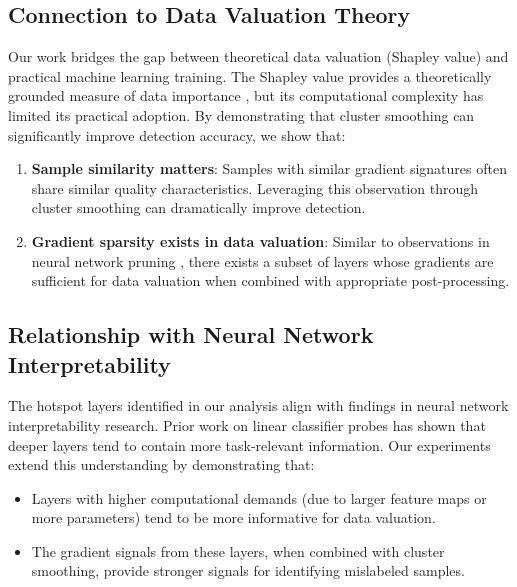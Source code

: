 \documentclass[12pt,a4paper]{report}
\begin{document}
\subsection{Connection to Data Valuation Theory}
\label{sec:theory_connection}

Our work bridges the gap between theoretical data valuation (Shapley value) and practical machine learning training. The Shapley value provides a theoretically grounded measure of data importance \citep{ghorbani2019data}, but its computational complexity has limited its practical adoption. By demonstrating that cluster smoothing can significantly improve detection accuracy, we show that:

\begin{enumerate}
    \item \textbf{Sample similarity matters}: Samples with similar gradient signatures often share similar quality characteristics. Leveraging this observation through cluster smoothing can dramatically improve detection.
    
    \item \textbf{Gradient sparsity exists in data valuation}: Similar to observations in neural network pruning \citep{morcos2018importance}, there exists a subset of layers whose gradients are sufficient for data valuation when combined with appropriate post-processing.
\end{enumerate}

\subsection{Relationship with Neural Network Interpretability}
\label{sec:interpretability}

The hotspot layers identified in our analysis align with findings in neural network interpretability research. Prior work on linear classifier probes \citep{alain2016understanding} has shown that deeper layers tend to contain more task-relevant information. Our experiments extend this understanding by demonstrating that:

\begin{itemize}
    \item Layers with higher computational demands (due to larger feature maps or more parameters) tend to be more informative for data valuation.
    
    \item The gradient signals from these layers, when combined with cluster smoothing, provide stronger signals for identifying mislabeled samples.
\end{itemize}
\end{document}
